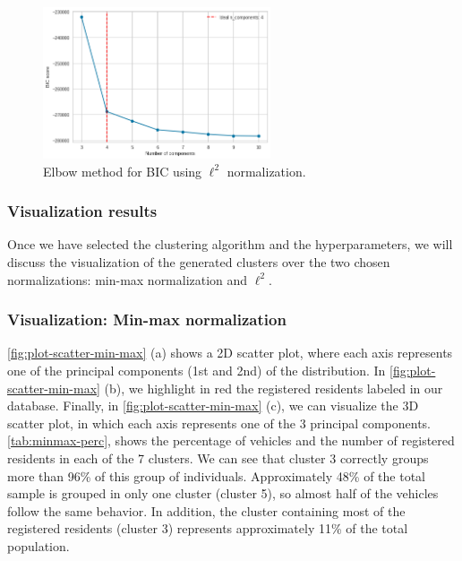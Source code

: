 \begin{figure}
    \centering
    \includegraphics[width=0.6\textwidth]{Images/bic_l2_elbow.png}
    \caption{Elbow method for BIC using $\ell^2$ normalization.}
    \label{fig:plot-l2-elbow}
\end{figure}

\subsubsection*{Visualization results}

Once we have selected the clustering algorithm and the hyperparameters, we will discuss the visualization of the generated clusters over the two chosen normalizations: min-max normalization and $\ell^2$.  

\subsubsection*{Visualization: Min-max normalization}

\cref{fig:plot-scatter-min-max} (a) shows a 2D scatter plot, where each axis represents one of the principal components (1st and 2nd) of the distribution. In \cref{fig:plot-scatter-min-max} (b), we highlight in red the registered residents labeled in our database. Finally, in \cref{fig:plot-scatter-min-max} (c), we can visualize the 3D scatter plot, in which each axis represents one of the 3 principal components. \cref{tab:minmax-perc}, shows the percentage of vehicles and the number of registered residents in each of the 7 clusters. We can see that cluster 3 correctly groups more than 96\% of this group of individuals. Approximately 48\% of the total sample is grouped in only one cluster (cluster 5), so almost half of the vehicles follow the same behavior. In addition, the cluster containing most of the registered residents (cluster 3) represents approximately 11\% of the total population.


